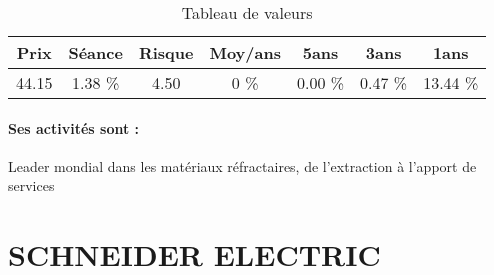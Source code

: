 \documentclass[11pt,a4paper]{report}%
\begin{document}
\begin{table}[H]
  \centering
    \begin{tabular}{|c|c|c|c|c|c|c|}
    \hline
    Prix & Séance & Risque  & Moy/ans & 5ans & 3ans & 1ans \\
    \hline
    44.15 &    1.38 \%    & 4.50 & 0 \% & 0.00 \% & 0.47 \% & 13.44 \% \\
    \hline
    \end{tabular}%
        \label{tab:table_RHI MAGNESITA}%
      \caption{Tableau de valeurs}
\end{table}%

\paragraph{Ses activités sont : } Leader mondial dans les matériaux réfractaires, de l’extraction à l’apport de services 
    
    \newpage

\section{SCHNEIDER ELECTRIC}
\end{document}
